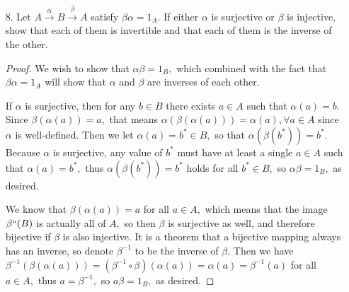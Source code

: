 \documentclass{article}
\begin{document}
\begin{itemize}
	\item[8.] Let $A\xrightarrow{\alpha}B\xrightarrow{\beta}A$ satisfy $\beta\alpha=1_A.$ If either $\alpha$ is surjective or $\beta$ is injective, show that each of them is invertible and that each of them is the inverse of the other.
			\begin{proof}
				We wish to show that $\alpha\beta=1_B,$ which combined with the fact that $\beta\alpha=1_A$ will show that $\alpha$ and $\beta$ are inverses of each other. 

				If $\alpha$ is surjective, then for any $b\in B$ there exists $a\in A$ such that $\alpha(a)=b.$ Since $\beta(\alpha(a))=a,$ that means $\alpha(\beta(\alpha(a)))=\alpha(a), \forall a\in A$ since $\alpha$ is well-defined. Then we let $\alpha(a)=b^*\in B,$ so that $\alpha(\beta(b^*))=b^*.$ Because $\alpha$ is surjective, any value of $b^*$ must have at least a single $a\in A$ such that $\alpha(a)=b^*,$ thus $\alpha(\beta(b^*))=b^*$ holds for all $b^*\in B,$ so $\alpha\beta=1_B,$ as desired.

				We know that $\beta(\alpha(a))=a$ for all $a\in A,$ which means that the image $\beta``(B)$ is actually all of $A,$ so then $\beta$ is surjective as well, and therefore bijective if $\beta$ is also injective. It is a theorem that a bijective mapping always has an inverse, so denote $\beta^{-1}$ to be the inverse of $\beta.$ Then we have $\beta^{-1}(\beta(\alpha(a)))=(\beta^{-1}\circ\beta)(\alpha(a))=\alpha(a)=\beta^{-1}(a)$ for all $a\in A,$ thus $a=\beta^{-1},$ so $a\beta=1_B,$ as desired. 
											
			\end{proof}
\end{itemize}
\end{document}
